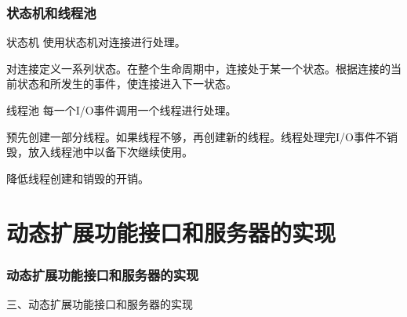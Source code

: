 \documentclass[10pt,dvipdfm]{beamer}
\begin{document}
\begin{frame}
	\frametitle{状态机和线程池}
	\begin{block}{状态机}
	使用状态机对连接进行处理。
	
	对连接定义一系列状态。在整个生命周期中，连接处于某一个状态。根据连接的当前状态和所发生的事件，使连接进入下一状态。
	\end{block}
	\pause
	\begin{block}{线程池}
	每一个I/O事件调用一个线程进行处理。
	
	预先创建一部分线程。如果线程不够，再创建新的线程。线程处理完I/O事件不销毁，放入线程池中以备下次继续使用。
	
	降低线程创建和销毁的开销。
	\end{block}
\end{frame}

\section{动态扩展功能接口和服务器的实现}

\begin{frame}
	\frametitle{动态扩展功能接口和服务器的实现}
	\begin{center}
	{\Large
		三、动态扩展功能接口和服务器的实现
	}
	\end{center}
\end{frame}

\end{document}
